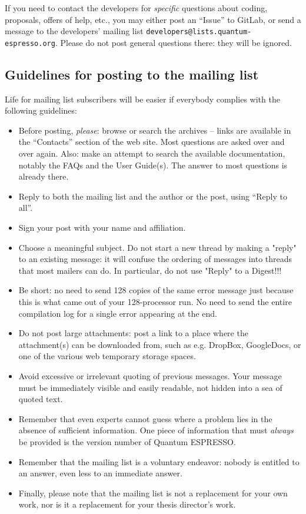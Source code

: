 \documentclass[12pt,a4paper]{article}
\def\qe{{\sc Quantum ESPRESSO}}
\begin{document}
If you need to contact the developers for {\em specific} questions
about coding, proposals, offers of help, etc., you may either post
an ``Issue'' to GitLab, or send a message
to the developers' mailing list \texttt{developers@lists.quantum-espresso.org}.
Please do not post general questions there: they will be ignored.

\subsection{Guidelines for posting to the mailing list}
\label{SubSec:Guidelines}
Life for mailing list subscribers will be easier if everybody
complies with the following guidelines:
\begin{itemize}
\item Before posting, {\em please}: browse or search the archives --
  links are available in the ``Contacts'' section  of the   web site.
  Most questions are asked over and over again. Also: make an attempt
  to search the
  available documentation, notably the FAQs and the User Guide(s).
  The answer to most questions is already there.
\item Reply to both the mailing list and the author or the post, using
  ``Reply to all''.
\item Sign your post with your name and affiliation.
\item Choose a meaningful subject. Do not start a new thread by making
      a	"reply" to an existing message: it will confuse the ordering of 
      messages into threads that most mailers can do. In particular, do
      not use "Reply" to a Digest!!!
\item Be short: no need to send 128 copies of the same error message just
  because this is what came out of your 128-processor run. No need to
  send the entire compilation log for a single error appearing at the end.
\item Do not post large attachments: post a link to a place where the
  attachment(s) can be downloaded from, such as e.g. DropBox, GoogleDocs, 
  or one of the various web temporary storage spaces.
\item Avoid excessive or irrelevant quoting of previous messages. Your
  message must be immediately visible and easily readable, not hidden
  into a sea of quoted text.
\item Remember that even experts cannot guess where a problem lies in
  the absence of sufficient information. One piece of information that
  must {\em always} be provided is the version number of \qe.
\item Remember that the mailing list is a voluntary endeavor: nobody is
  entitled to an answer, even less to an immediate answer.
\item Finally, please note that the mailing list is not a replacement
  for your own work, nor is it a replacement for your thesis director's
  work.
\end{itemize}
\end{document}
